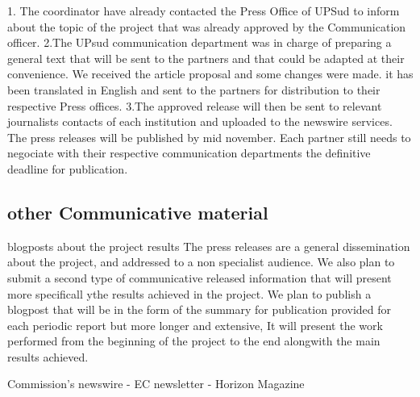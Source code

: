 \documentclass{deliverablereport}
\begin{document}
 1. The coordinator have already contacted the Press Office of UPSud to inform about the topic
 of the project that was already approved by the Communication officer. 
 2.The UPsud communication department was in charge of preparing a general text that will be sent
 to the partners and that could be adapted at their convenience. We received the article proposal 
 and some changes were made. it has been translated in English and sent to the partners 
 for distribution to their respective Press offices. 
 3.The approved release will then be sent to relevant journalists contacts of each institution 
 and uploaded to the newswire services. The press releases will be published by mid november. 
 Each partner still needs to negociate with their respective communication departments the 
 definitive deadline for publication.

\subsection{other Communicative material}

 \item blogposts about the project results
 The press releases are a general dissemination about the project, and addressed to 
 a non specialist audience. We also plan to submit a second type of communicative released 
 information that will present more specificall ythe results achieved in the project.
 We plan to publish a blogpost that will be in the form of the summary for publication
 provided for each periodic report but more longer and  extensive, It will present the 
 work performed from the beginning of the project to the end alongwith the main results achieved.
 
 \European Commission's newswire
 - EC newsletter
 - Horizon Magazine
\end{document}
